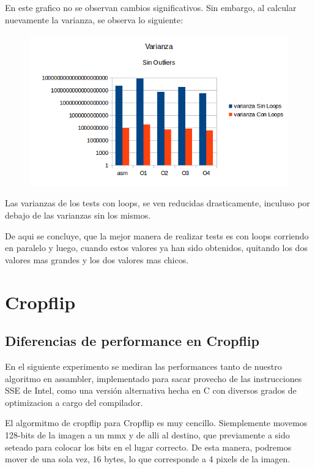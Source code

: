 \documentclass[a4paper]{article}
\begin{document}
En este grafico no se observan cambios significativos. Sin embargo, al calcular nuevamente la varianza, se observa lo siguiente:

\begin{figure}[h!]
  \begin{center}
	\includegraphics[scale=0.66]{Graficos1.4/1.3/VSO.png}
	\label{nombreparareferenciar4}
  \end{center}
\end{figure}

Las varianzas de los tests con loops, se ven reducidas drasticamente, inculuso por debajo de las varianzas sin los mismos.

De aqui se concluye, que la mejor manera de realizar tests es con loops corriendo en paralelo y luego, cuando estos valores ya han sido obtenidos, quitando los dos valores mas grandes y los dos valores mas chicos.

\newpage
\section{Cropflip}
\subsection{Diferencias de performance en Cropflip}
En el siguiente experimento se mediran las performances tanto de nuestro algoritmo en assambler, implementado para sacar provecho de las instrucciones SSE de Intel, como una versión alternativa hecha en C con diversos grados de optimizacion a cargo del compilador.

El algormitmo de cropflip para Cropflip es muy cencillo. Siemplemente movemos 128-bits de la imagen a un mmx y de alli al destino, que previamente a sido seteado para colocar los bits en el lugar correcto. De esta manera, podremos mover de una sola vez, 16 bytes, lo que corresponde a 4 pixels de la imagen.
\end{document}
